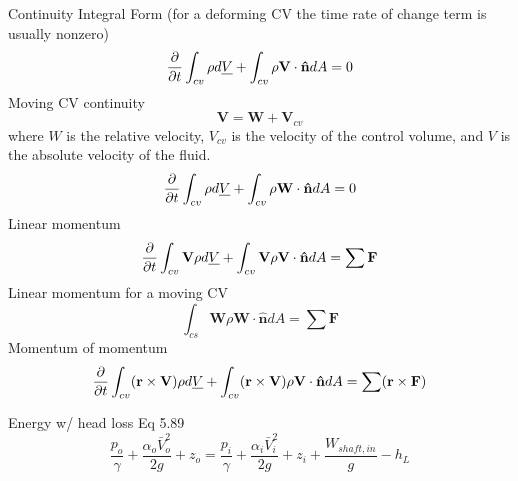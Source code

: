 \documentclass{article}
\begin{document}
Continuity Integral Form (for a deforming CV the time rate of change term is usually nonzero)
\begin{equation}
    \frac{\partial}{\partial t}\int_{cv}\rho d\sout{V} + \int_{cv}\rho \mathbf{V}\cdot \mathbf{\hat{n}} dA = 0
\end{equation}
\newline
\newline
Moving CV continuity
\begin{equation}
    \mathbf{V} = \mathbf{W} + \mathbf{V}_{cv}
\end{equation}
\noindent where $W$ is the relative velocity, $V_{cv}$ is the velocity of the control volume, and $V$ is the absolute velocity of the fluid.
\begin{equation}
     \frac{\partial}{\partial t}\int_{cv}\rho d\sout{V} + \int_{cv}\rho \mathbf{W}\cdot \mathbf{\hat{n}} dA = 0
\end{equation}
\newline
\newline
Linear momentum 
\begin{equation}
    \frac{\partial}{\partial t}\int_{cv}\mathbf{V}\rho d\sout{V} + \int_{cv}\mathbf{V}\rho \mathbf{V}\cdot \mathbf{\hat{n}} dA = \sum\mathbf{F}
\end{equation}
\newline
\newline
Linear momentum for a moving CV
\begin{equation}
    \int_{cs}\mathbf{W}\rho\mathbf{W}\cdot \mathbf{\hat{n}} dA = \sum\mathbf{F}
\end{equation}
\newline
\newline
Momentum of momentum 
\begin{equation}
    \frac{\partial}{\partial t}\int_{cv}(\mathbf{r}\times\mathbf{V})\rho d\sout{V} + \int_{cv}(\mathbf{r}\times\mathbf{V})\rho \mathbf{V}\cdot \mathbf{\hat{n}} dA = \sum(\mathbf{r}\times\mathbf{F})
\end{equation}
\newline
\newline
    
Energy w/ head loss Eq 5.89
\begin{equation}
    \frac{p_o}{\gamma} + \frac{\alpha_o\bar{V}^2_o}{2g}+z_o = \frac{p_i}{\gamma} + \frac{\alpha_i\bar{V}^2_i}{2g}+z_i + \frac{W_{shaft,in}}{g} - h_L
\end{equation}
\end{document}
